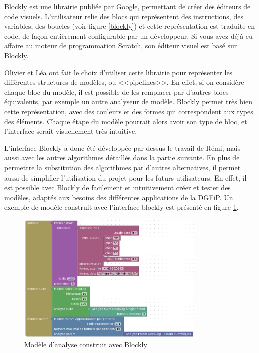 \documentclass[openany, 11pt]{memoir}
\begin{document}
Blockly est une librairie publiée par Google, permettant de créer des éditeurs de code visuels. L'utilisateur relie des blocs qui représentent des instructions, des variables, des boucles (voir figure \ref{blockly}) et cette représentation est traduite en code, de façon entièrement configurable par un développeur. Si vous avez déjà eu affaire au moteur de programmation Scratch, son éditeur visuel est basé sur Blockly.

\bigskip
Olivier et Léa ont fait le choix d'utiliser cette librairie pour représenter les différentes structures de modèles, ou <<pipelines>>. En effet, si on considère chaque bloc du modèle, il est possible de les remplacer par d'autres blocs équivalents, par exemple un autre analyseur de modèle. Blockly permet très bien cette représentation, avec des couleurs et des formes qui correspondent aux types des éléments. Chaque étape du modèle pourrait alors avoir son type de bloc, et l'interface serait visuellement très intuitive.

L'interface Blockly a donc été développée par dessus le travail de Rémi, mais aussi avec les autres algorithmes détaillés dans la partie suivante. En plus de permettre la substitution des algorithmes par d'autres alternatives, il permet aussi de simplifier l'utilisation du projet pour les futurs utilisateurs. En effet, il est possible avec Blockly de facilement et intuitivement créer et tester des modèles, adaptés aux besoins des différentes applications de la \gls{DGFiP}. Un exemple de modèle construit avec l'interface blockly est présenté en figure \ref{blocklydeeplog}.

\begin{figure}[ht]
	\centering
	\includegraphics[width=0.8\textwidth]{images/blockly_deeplog.png}
	\caption{Modèle d'analyse construit avec Blockly}
	\label{blocklydeeplog}
\end{figure}
\end{document}
